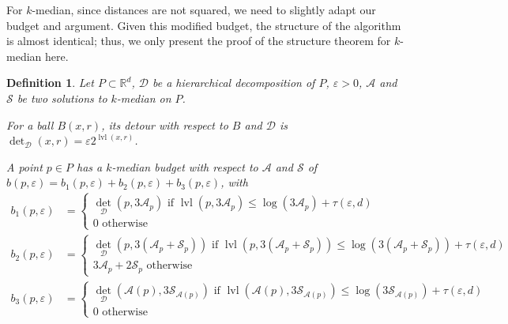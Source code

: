 \documentclass[11pt]{article}
\newtheorem{definition}[theorem]{Definition}
\newcommand{\R}{\mathbb R}
\newcommand{\eps}{\varepsilon}
\newcommand{\calD}{\mathcal {D}}
\newcommand{\calS}{\mathcal {S}}
\newcommand{\calL}{\mathcal{A}}
\newcommand{\offset}{\tau(\eps, d)}
\DeclareMathOperator{\deto}{det}
\newcommand{\lpar}{\left(}
\newcommand{\rpar}{\right)}
\DeclareMathOperator{\level}{lvl}
\newcommand{\david}[1]{\textcolor{orange}{#1}}
\begin{document}
For $k$-median, since distances are not squared, we need to slightly adapt our budget and argument. Given this modified budget, the structure of the algorithm is almost identical; thus, we only present the proof of the structure theorem for $k$-median here.

\begin{definition}\label{def:budgetKmed}
Let $P\subset \R^d$, $\calD$ be 
a hierarchical decomposition of $P$, $\eps > 0$, $\calL$ and $\calS$ be two 
solutions to $k$-median on $P$. 

For a ball $B(x, r)$, its \emph{detour} with respect to $B$ and $\calD$ is $\deto_\calD(x, r) = \eps 2^{\level(x, r)}$.

A point $p\in P$ has a $k$-median budget with respect to $\calL$ and $\calS$ of $b(p, \eps) = b_1(p, \eps) + b_2(p, \eps) + b_3(p, \eps)$, with
\begin{align*}
    b_1(p, \eps) &= \begin{cases} 
 \deto_\calD(p, 3\calL_p)\text{ if } \level(p, 3\calL_p)\leq \log(3\calL_p) + \offset \\
  0\text{ otherwise }
\end{cases}
\\
b_2(p, \eps) &= \begin{cases} 
\deto_\calD\lpar p, 3(\calL_p + \calS_p)\rpar
 \text{ if } \level(p, 3(\calL_p + \calS_p))\leq \log(3(\calL_p + \calS_p)) + \offset \\
 3\calL_p + 2\calS_p \text{ otherwise }
\end{cases}
\\
b_3(p, \eps) &= \begin{cases} 
\deto_\calD(\calL(p),  3\calS_{\calL(p)})
 \text{ if } \level(\calL(p), 3\calS_{\calL(p)})\leq \log(3\calS_{\calL(p)}) + \offset \\
 0 \text{ otherwise }
\end{cases}
\end{align*}
\end{definition}
\end{document}
